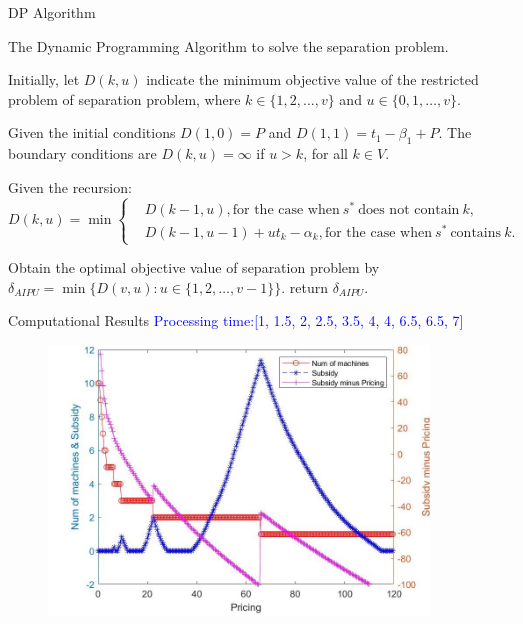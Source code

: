 \documentclass[14pt]{beamer}
\begin{document}
\begin{frame}{DP Algorithm}
	\begin{block}
		{The Dynamic Programming Algorithm to solve the separation problem.}
	\end{block}
	\begin{description}
	\justifying
	\footnotesize
	\item[Step 1.] Initially, let $D(k,u)$ indicate the minimum objective value of the restricted problem of separation problem, where $k\in \{1,2,\ldots,v\}$ and $u\in \{0,1,\ldots,v\}$.
	\item[Step 2.] Given the initial conditions $D(1,0) = P$ and $D(1,1) = t_1 - \beta_1 +P$. The boundary conditions are $D(k,u) = \infty$ if $u > k$, for all $k \in V$.
	\item[Step 3.] Given the recursion:
	\begin{equation*}
	D(k,u)= \min \left\{
	\begin{aligned}
	& D(k-1,u), \text{for the case when} \ s^* \ \text{does not contain} \ k, \\
	& D(k-1,u-1) + u t_k - \alpha_k ,\text{for the case when} \ s^* \ \text{contains} \ k.
	\end{aligned}
	\right.
	\end{equation*}

\item[Step 4.] Obtain the optimal objective value of separation problem by
$\delta_{AIPU} = \min\{D(v,u): u\in \{1,2,\ldots,v-1\}\}$.
 return $\delta_{AIPU}$.
\end{description}

\end{frame}

\begin{frame}{Computational Results}
	\small
	\centering
	\textcolor{blue}{Processing time:[1, 1.5, 2, 2.5, 3.5, 4, 4, 6.5, 6.5, 7]}
	\vspace{-3mm}
	\begin{figure}[H]
	\centering
	\includegraphics[width=0.9\textwidth]{Figures/Image2}
	\end{figure}
	\centering
\end{frame}
\end{document}
